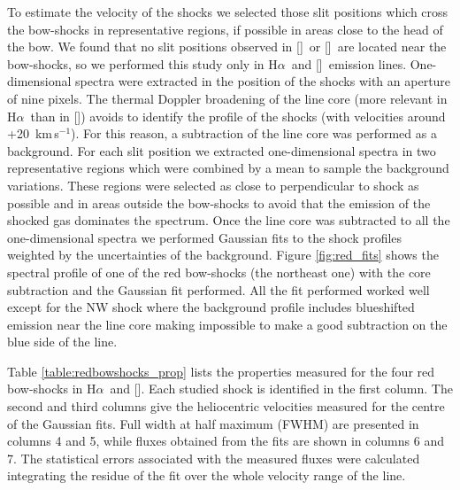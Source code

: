 \documentclass[a4paper,fleqn,usenatbib]{mnras}     %
\newcommand{\Ha} {H$\alpha$}      		%
\newcommand{\NII} {[\ion{N}{ii}]}            %
\newcommand{\SII} {[\ion{S}{ii}]}             %
\newcommand{\OIII} {[\ion{O}{iii}]}          %
\newcommand{\kms}{\,km\,s$^{-1}$}	       %
\begin{document}
To estimate the velocity of the shocks we selected those slit positions which cross the bow-shocks in representative regions, if possible 
in areas close to the head of the bow. We found that no slit positions observed in \SII~or \OIII~are located near the bow-shocks, 
so we performed this study only in \Ha~and \NII~emission lines. One-dimensional spectra were extracted in the position of the shocks 
with an aperture of nine pixels. The thermal Doppler broadening of the line core (more relevant in \Ha~than in \NII) avoids to identify the 
profile of the shocks (with velocities around +20 \kms). For this reason, a subtraction of the line core was performed as a background. For each slit position
we extracted one-dimensional spectra in two representative regions which were combined by a mean to sample the background 
variations. These regions were selected as close to perpendicular to shock as possible and in areas outside the bow-shocks to avoid that 
the emission of the shocked gas dominates the spectrum. Once the line core was subtracted to all the one-dimensional spectra we 
performed Gaussian fits to the shock profiles weighted by the uncertainties of the background. Figure \ref{fig:red_fits} shows the spectral 
profile of one of the red bow-shocks (the northeast one) with the core subtraction and the Gaussian fit performed. All the fit performed worked 
well except for the NW shock where the background profile includes blueshifted emission near the line core making impossible to make a good 
subtraction on the blue side of the line.


Table \ref{table:redbowshocks_prop} lists the properties measured for the four red bow-shocks in \Ha~and \NII. Each studied shock is identified 
in the first column. The second and third columns give the heliocentric velocities measured for the centre of the Gaussian fits. Full width 
at half maximum (FWHM) are presented in columns 4 and 5, while fluxes obtained from the fits are shown in columns 6 and 7. The statistical errors 
associated with the measured fluxes were calculated integrating the residue of the fit over the whole velocity range of the line.\\
\end{document}
